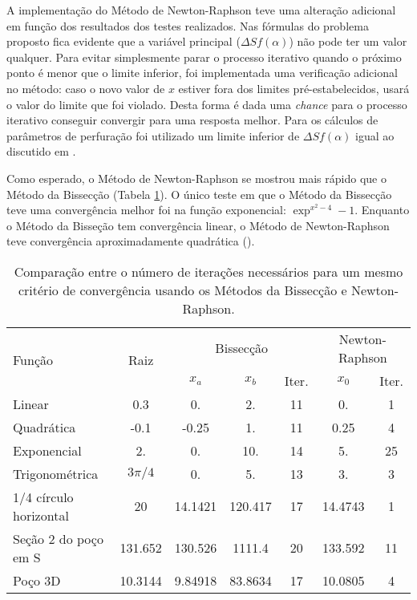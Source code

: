 \documentclass[final,3p,12pt]{elsarticle}
\begin{document}
    A implementação do Método de Newton-Raphson teve uma alteração adicional em função dos resultados dos testes realizados. Nas fórmulas do problema proposto fica evidente que a variável principal ($\Delta S f(\alpha)$) não pode ter um valor qualquer. Para evitar simplesmente parar o processo iterativo quando o próximo ponto é menor que o limite inferior, foi implementada uma verificação adicional no método: caso o novo valor de $x$ estiver fora dos limites pré-estabelecidos, usará o valor do limite que foi violado. Desta forma é dada uma \emph{chance} para o processo iterativo conseguir convergir para uma resposta melhor. Para os cálculos de parâmetros de perfuração foi utilizado um limite inferior de $\Delta S f(\alpha)$ igual ao discutido em \cite{relatoriobisseccao}.

    Como esperado, o Método de Newton-Raphson se mostrou mais rápido que o Método da Bissecção (Tabela \ref{table:iteracoes}). O único teste em que o Método da Bissecção teve uma convergência melhor foi na função exponencial: $\exp^{x^2-4}-1$. Enquanto o Método da Bisseção tem convergência linear, o Método de Newton-Raphson teve convergência aproximadamente quadrática (). 

    \begin{table}[h] 
        \centering
        \caption{Comparação entre o número de iterações necessários para um mesmo critério de convergência usando os Métodos da Bissecção e Newton-Raphson.}
        \begin{tabular}{ l c c c c c c }
            \multirow{2}{*}{Função} & \multirow{2}{*}{Raiz} & \multicolumn{3}{c}{Bissecção} & \multicolumn{2}{c}{Newton-Raphson} \\
              &  & $x_a$ & $x_b$ & Iter. & $x_0$ & Iter. \\ 
            \hline
            Linear & 0.3 & 0. & 2. &  11 & 0. & 1\\
            Quadrática & -0.1 & -0.25 & 1. & 11 & 0.25 & 4  \\
            Exponencial  & 2. & 0. & 10. & 14 & 5. & 25 \\
            Trigonométrica & $3\pi/4$ & 0. & 5. & 13 & 3. & 3  \\
            1/4 círculo horizontal & 20 & 14.1421 & 120.417 & 17 & 14.4743 & 1 \\
            Seção 2 do poço em S & 131.652 & 130.526 & 1111.4 & 20 & 133.592 & 11 \\
            Poço 3D & 10.3144 & 9.84918 & 83.8634 & 17 & 10.0805 & 4 \\
        \end{tabular}
        \label{table:iteracoes}
    \end{table}
    
\end{document}

